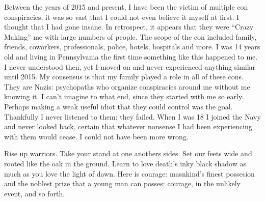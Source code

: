 \documentclass{article}
\date{\today}
\begin{document}
\maketitle

\begin{multicols}{2}


\begin{window} 
\end{window}

Between the years of 2015 and present, I have been the victim of multiple con conspiracies; it was so vast that I could not even believe it myself at first. I thought that I had gone insane. In retrospect, it appears that they were “Crazy Making” me with large numbers of people. The scope of the con included family, friends, coworkers, professionals, police, hotels, hospitals and more. I was 14 years old and living in Pennsylvania the first time something like this happened to me. I never understood then, yet I moved on and never experienced anything similar until 2015. My consensus is that my family played a role in all of these cons. They are Nazis: psychopaths who organize conspiracies around me without me knowing it. I can’t imagine to what end, since they started with me so early. Perhaps making a weak useful idiot that they could control was the goal. Thankfully I never listened to them: they failed. When I was 18 I joined the Navy and never looked back, certain that whatever nonsense I had been experiencing with them would cease. I could not have been more wrong.

Rise up warriors. Take your stand at one anothers sides. Set our feets wide and rooted like the oak in the ground. Learn to love death's inky black shadow as much as you love the light of dawn. Here is courage:  masnkind's finest possesion and the  noblest prize that a young man can posses: courage, in the unlikely event, and so forth. 

\end{multicols}

\closearticle
\end{document}
